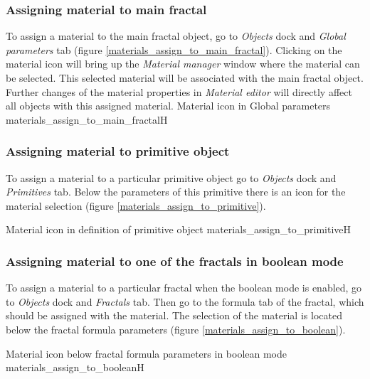 \subsubsection{Assigning material to main fractal}\label{assigning-material-to-main-fractal}

To assign a material to the main fractal object, go to \emph{Objects} dock and \emph{Global parameters} tab (figure \ref{materials_assign_to_main_fractal}). Clicking on the material icon will bring up the \emph{Material manager} window where the material can be selected. This selected material will be associated with the main fractal object. Further changes of the material properties in \emph{Material editor} will directly affect all objects with this assigned material.
\nopagebreak
{}
{Material icon in Global parameters}
{materials_assign_to_main_fractal}{H}

\subsubsection{Assigning material to primitive object}\label{assigning-material-to-primitive}

To assign a material to a particular primitive object go to \emph{Objects} dock and \emph{Primitives} tab. Below the parameters of this primitive there is an icon for the material selection (figure \ref{materials_assign_to_primitive}).
 
\nopagebreak
{}
{Material icon in definition of primitive object}
{materials_assign_to_primitive}{H}

\subsubsection{Assigning material to one of the fractals in boolean mode}\label{assigning-material-to-boolean}

To assign a material to a particular fractal when the boolean mode is enabled, go to \emph{Objects} dock and \emph{Fractals} tab. Then go to the formula tab of the fractal, which should be assigned with the material. The selection of the material is located below the fractal formula parameters (figure \ref{materials_assign_to_boolean}).

\nopagebreak
{}
{Material icon below fractal formula parameters in boolean mode}
{materials_assign_to_boolean}{H}

